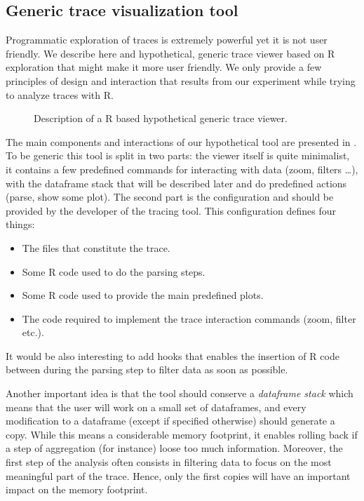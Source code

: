 \subsection{Generic trace visualization tool}

Programmatic exploration of traces is extremely powerful yet it is not user friendly.
We describe here and hypothetical, generic trace viewer based on \gls{R} exploration that might make it more user friendly.
We only provide a few principles of design and interaction that results from our experiment while trying to analyze traces with \gls{R}.

\begin{figure}[htb]
    \centering
    
    \caption{Description of a R based hypothetical generic trace viewer.}
    \label{fig:generic-viewer}
\end{figure}

The main components and interactions of our hypothetical tool are presented in .
To be generic this tool is split in two parts: the viewer itself is quite minimalist, it contains a few predefined commands for interacting with data (zoom, filters \ldots), with the dataframe stack that will be described later and do predefined actions (parse, show some plot).
The second part is the configuration and should be provided by the developer of the tracing tool.
This configuration defines four things:
\begin{itemize}
    \item The files that constitute the trace.
    \item Some \gls{R} code used to do the parsing steps.
    \item Some \gls{R} code used to provide the main predefined plots.
    \item The code required to implement the trace interaction commands (zoom, filter etc.).
\end{itemize}
It would be also interesting to add hooks that enables the insertion of \gls{R} code between during the parsing step to filter data as soon as possible.

Another important idea is that the tool should conserve a \emph{dataframe stack} which means that the user will work on a small set of dataframes, and every modification to a dataframe (except if specified otherwise) should generate a copy.
While this means a considerable memory footprint, it enables rolling back if a step of aggregation (for instance) loose too much information.
Moreover, the first step of the analysis often consists in filtering data to focus on the most meaningful part of the trace.
Hence, only the first copies will have an important impact on the memory footprint.

